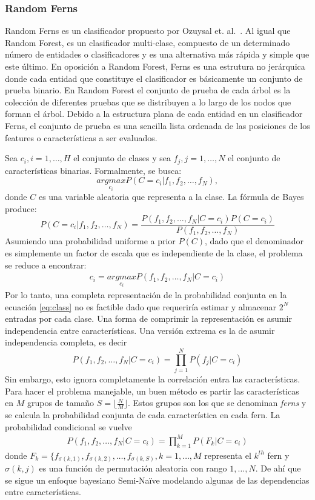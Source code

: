 \subsubsection{Random Ferns} 
\label{subsection:ferns}
	
		Random Ferns es un clasificador propuesto por Ozuysal et. al.~\cite{Ozuysal}. Al igual que Random Forest, es un clasificador multi-clase, compuesto de un determinado número de entidades o clasificadores y es una alternativa más rápida y simple que este último. En oposición a Random Forest, Ferns es una estrutura no jerárquica donde cada entidad que constituye el clasificador es básicamente un conjunto de prueba binario. En Random Forest el conjunto de prueba de cada árbol es la colección de diferentes pruebas que se distribuyen a lo largo de los nodos que forman el árbol. Debido a la estructura plana de cada entidad en un clasificador Ferns, el conjunto de prueba es una sencilla lista ordenada de las posiciones de los features o características a ser evaluados.
		
		Sea $c_i, i=1,\dots,H$ el conjunto de clases y  sea $f_j, j=1,\dots,N$ el conjunto de características binarias. Formalmente, se busca:
		$$\underset{c_i}{argmax}P(C=c_i \vert f_1,f_2,\dots,f_N),$$
		donde $C$ es una variable aleatoria que representa a la clase. La fórmula de Bayes produce:
		$$P(C=c_i \vert f_1,f_2,\dots,f_N) = \frac{P(f_1,f_2,\dots,f_N \vert C=c_i)P(C=c_i)}{P(f_1,f_2,\dots,f_N)}$$
		Asumiendo una probabilidad uniforme a prior $P(C)$, dado que el denominador es simplemente un factor de escala que es independiente de la clase, el problema se reduce a encontrar:
		\begin{align}\label{eq:class}
			c_i  = \underset{c_i}{argmax}P(f_1,f_2,\dots,f_N \vert C=c_i)
		\end{align}
		Por lo tanto, una completa representación de la probabilidad conjunta en la ecuación \ref{eq:class} no es factible dado que requeriría estimar y almacenar $2^N$ entradas por cada clase. Una forma de comprimir la representación es asumir independencia entre características. Una versión extrema es la de asumir independencia completa, es decir
		$$P(f_1,f_2,\dots,f_N \vert C=c_i) = \prod_{j=1}^NP(f_j \vert C=c_i)$$
		Sin embargo, esto ignora completamente la correlación entra las características. Para hacer el problema manejable, un buen método es partir las características en $M$ grupos de tamaño $S=\lfloor \frac{N}{M} \rfloor$. Estos grupos son los que se denominan \textit{ferns} y se calcula la probabilidad conjunta de cada característica en cada fern. La probabilidad condicional se vuelve
		\begin{align}\label{eq:class2}
			P(f_1,f_2,\dots,f_N \vert C=c_i) = \prod_{k=1}^MP(F_k \vert C=c_i)
		\end{align}
		donde $F_k = \{ f_{\sigma(k,1)},f_{\sigma(k,2)},\dots,f_{\sigma(k,S)}, k=1,\dots,M$ representa el $k^{th}$ fern y $\sigma(k,j)$ es una función de permutación aleatoria con rango $1,\dots,N$. De ahí que se sigue un enfoque bayesiano Semi-Na\"{i}ve modelando algunas de las dependencias entre características.

